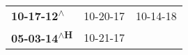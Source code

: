 \begin{supertabular}{lll}
  \textbf{10-17-12\textsuperscript{$\wedge$}} &  10-20-17\textsuperscript{} &  10-14-18\textsuperscript{} \\
 \textbf{05-03-14\textsuperscript{$\wedge$H}} &  10-21-17\textsuperscript{} &                             \\
\end{supertabular}
